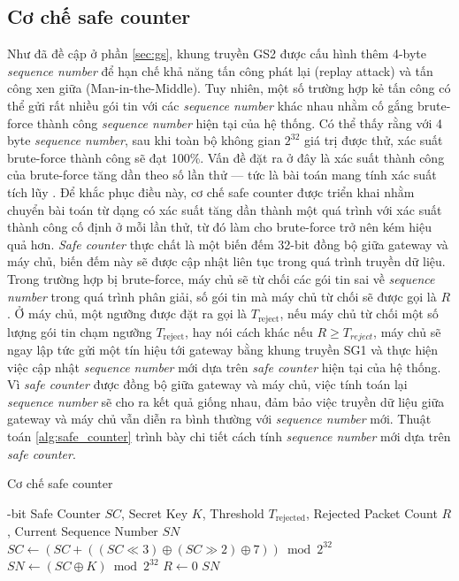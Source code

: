 \subsection{Cơ chế safe counter}
\label{sec:safe_counter}
Như đã đề cập ở phần \ref{sec:gs}, khung truyền GS2 được cấu hình thêm 4-byte \textit{sequence number} để hạn chế khả năng tấn công phát lại (replay attack) và tấn công xen giữa (Man-in-the-Middle). Tuy nhiên, một số trường hợp kẻ tấn công có thể gửi rất nhiều gói tin với các \textit{sequence number} khác nhau nhằm cố gắng brute-force thành công \textit{sequence number} hiện tại của hệ thống. Có thể thấy rằng với 4 byte \textit{sequence number}, sau khi toàn bộ không gian $2^{32}$ giá trị được thử, xác suất brute-force thành công sẽ đạt 100\%. Vấn đề đặt ra ở đây là xác suất thành công của brute-force tăng dần theo số lần thử — tức là bài toán mang tính xác suất tích lũy \cite{?}. Để khắc phục điều này, cơ chế safe counter được triển khai nhằm chuyển bài toán từ dạng có xác suất tăng dần thành một quá trình với xác suất thành công cố định ở mỗi lần thử, từ đó làm cho brute-force trở nên kém hiệu quả hơn. \textit{Safe counter} thực chất là một biến đếm 32-bit đồng bộ giữa gateway và máy chủ, biến đếm này sẽ được cập nhật liên tục trong quá trình truyền dữ liệu. Trong trường hợp bị brute-force, máy chủ sẽ từ chối các gói tin sai về \textit{sequence number} trong quá trình phân giải, số gói tin mà máy chủ từ chối sẽ được gọi là $R$. Ở máy chủ, một ngưỡng được đặt ra gọi là \(T_{\text{reject}} \), nếu máy chủ từ chối một số lượng gói tin chạm ngưỡng \(T_{\text{reject}} \), hay nói cách khác nếu $R \geq T_{reject}$, máy chủ sẽ ngay lập tức gửi một tín hiệu tới gateway bằng khung truyền SG1 và thực hiện việc cập nhật \textit{sequence number} mới dựa trên \textit{safe counter} hiện tại của hệ thống. Vì \textit{safe counter} được đồng bộ giữa gateway và máy chủ, việc tính toán lại \textit{sequence number} sẽ cho ra kết quả giống nhau, đảm bảo việc truyền dữ liệu giữa gateway và máy chủ vẫn diễn ra bình thường với \textit{sequence number} mới. Thuật toán \ref{alg:safe_counter} trình bày chi tiết cách tính \textit{sequence number} mới dựa trên \textit{safe counter}.

\begin{algorithm}[ht]
\caption{Cơ chế safe counter}
\small
\label{alg:safe_counter}
\begin{algorithmic}[1]
-bit Safe Counter $SC$, Secret Key $K$, Threshold $T_{\text{rejected}}$, Rejected Packet Count $R$, Current Sequence Number $SN$
\State $SC \gets (SC + ((SC \ll 3) \oplus (SC \gg 2) \oplus 7)) \bmod 2^{32}$
    \State $SN \gets (SC \oplus K) \bmod 2^{32}$
    \State $R \gets 0$
\EndIf
\Return $SN$
\end{algorithmic}
\end{algorithm}

